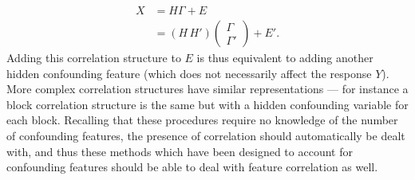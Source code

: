 \documentclass[11pt]{article}
\newcommand{\N}{\mathcal{N}}
\begin{document}
\begin{align*}
	X &= H\Gamma + E \\
	  &= (H\, H')\left( \begin{matrix}
	  	\Gamma \\ \Gamma'
	  \end{matrix} \right) + E'.
\end{align*}
Adding this correlation structure to $E$ is thus equivalent to adding another hidden confounding feature (which does not necessarily affect the response $Y$). More complex correlation structures have similar representations --- for instance a block correlation structure is the same but with a hidden confounding variable for each block.
 Recalling that these procedures require no knowledge of the number of confounding features, the presence of correlation should automatically be dealt with, and thus these methods which have been designed to account for confounding features should be able to deal with feature correlation as well. 

%
%
\end{document}
